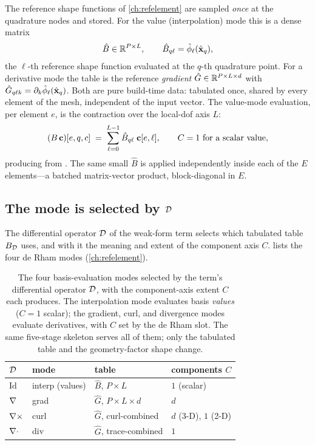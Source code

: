 The reference shape functions of \cref{ch:refelement} are sampled \emph{once} at
the quadrature nodes and stored. For the value (interpolation) mode this is a dense
matrix
\[
  \hat B \in \mathbb{R}^{P\times L},
  \qquad \hat B_{q\ell} = \hat\phi_\ell(\hat{\mathbf{x}}_q),
\]
the $\ell$-th reference shape function evaluated at the $q$-th quadrature point. For
a derivative mode the table is the reference \emph{gradient}
$\hat G\in\mathbb{R}^{P\times L\times d}$ with $\hat G_{q\ell k}=\partial_k\hat\phi_\ell
(\hat{\mathbf{x}}_q)$. Both are pure build-time data: tabulated once, shared by every element
of the mesh, independent of the input vector. The value-mode evaluation, per
element $e$, is the contraction over the local-dof axis $L$:
\begin{equation}
  (B\,\mathbf{c})[e,q,c] \;=\; \sum_{\ell=0}^{L-1} \hat B_{q\ell}\;\mathbf{c}[e,\ell],
  \qquad C=1\ \text{for a scalar value},
  \label{eq:appk-basis}
\end{equation}
producing \code{[(E, P, C)]} from \code{[(E, L)]}. The same small $\hat B$ is
applied independently inside each of the $E$ elements---a batched matrix-vector
product, block-diagonal in $E$.

\subsection{The mode is selected by \texorpdfstring{$\mathcal{D}$}{D}}

The differential operator $\mathcal{D}$ of the weak-form term selects which tabulated
table $B_{\mathcal{D}}$ uses, and with it the meaning and extent of the component axis
$C$.  lists the four de Rham modes (\cref{ch:refelement}).

\begin{table}[t]
\centering
\caption[Basis-evaluation modes and the component axis]{The four basis-evaluation
modes selected by the term's differential operator $\mathcal{D}$, with the
component-axis extent $C$ each produces. The interpolation mode evaluates basis
\emph{values} ($C=1$ scalar); the gradient, curl, and divergence modes evaluate
derivatives, with $C$ set by the de Rham slot. The same five-stage skeleton serves
all of them; only the tabulated table and the geometry-factor shape change.}
\label{tab:appk-modes}
\small
\setlength{\tabcolsep}{7pt}
\renewcommand{\arraystretch}{1.25}
\begin{tabular}{@{}llll@{}}
\toprule
$\mathcal{D}$ & mode & table & components $C$ \\
\midrule
$\mathrm{Id}$ & interp (values) & $\hat B$, $P\times L$ & $1$ (scalar) \\
$\nabla$ & grad & $\hat G$, $P\times L\times d$ & $d$ \\
$\nabla\times$ & curl & $\hat G$, curl-combined & $d$ (3-D), $1$ (2-D) \\
$\nabla\cdot$ & div & $\hat G$, trace-combined & $1$ \\
\bottomrule
\end{tabular}
\end{table}

